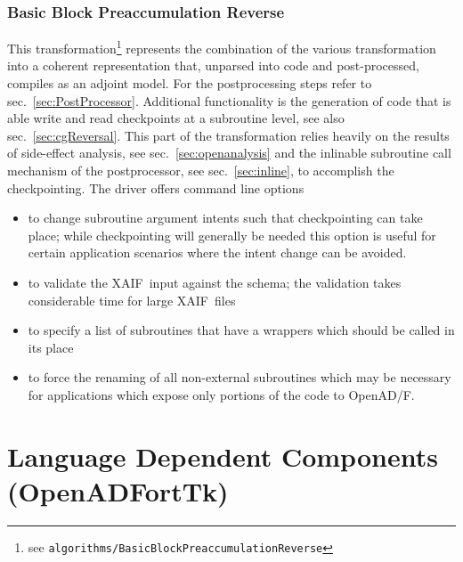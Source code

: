 \documentclass{book}
\newcommand{\OpenADF}{OpenAD/F}
\newcommand{\OpenADFortTk}{OpenADFortTk}
\newcommand{\xaif}{XAIF}
\newcommand{\refsec}[1]{{sec.~\ref{#1}}}
\begin{document}
\subsubsection{Basic Block Preaccumulation Reverse}\label{sec:BBRev}

This transformation\footnote{
  see \lstinline{algorithms/BasicBlockPreaccumulationReverse}
}
represents the combination of the various transformation 
into a coherent representation that, unparsed into code and post-processed, compiles 
as an adjoint model. 
For the postprocessing steps refer to \refsec{sec:PostProcessor}.
Additional functionality is the generation of code that is able write and 
read checkpoints at a subroutine level, see also \refsec{sec:cgReversal}. 
This part of the transformation relies heavily on the results of side-effect analysis, see 
\refsec{sec:openanalysis} and the inlinable subroutine call mechanism of 
the postprocessor, see \refsec{sec:inline}, to accomplish the checkpointing. 
The driver offers command line options
\begin{itemize}
\item to change subroutine argument intents 
  such that checkpointing can take place; while checkpointing will 
  generally be needed this option is useful 
  for certain application scenarios where the intent change can be avoided.
\item  to validate the \xaif\ input against the schema; the validation takes 
  considerable time for large \xaif\ files
\item to specify a list of subroutines 
  that have a wrappers which should be called in its place
\item to force the renaming of all non-external subroutines which may be necessary 
  for applications which expose only portions of the code to \OpenADF.
\end{itemize}

\section{Language Dependent Components (\OpenADFortTk)}\label{sec:fortfe}
\end{document}
